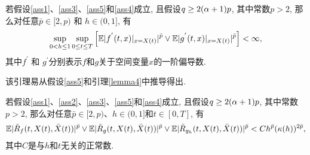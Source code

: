 \begin{lemma}
    \label{lemma4}
    若假设\ref{ass1}、\ref{ass3}、\ref{ass5}和\ref{ass4}成立, 且假设$q\geq 2(\alpha+1)p$, 其中常数$p>2$, 那么对任意$\bar{p}\in [2,p)$ 和 $h \in (0,1]$, 有
    \begin{align*}
        \sup_{0<h\leq 1}\sup_{0\leq t\leq T}\left [\mathbb{E}| f^{'}(t,x)|_{x=X(t)}|^{\bar{p}}\vee\mathbb{E}| g^{'}(t,x)|_{x=X(t)}|^{\bar{p}}  \right ]< \infty ,
    \end{align*}
    其中$f^{'}$ 和 $g^{'}$分别表示$f$和$g$关于空间变量$x$的一阶偏导数.
    \par
     该引理易从假设\ref{ass5}和引理\ref{lemma4}中推导得出.
    \end{lemma} 
\begin{lemma}
    \label{lemma5}
    若假设\ref{ass1}、\ref{ass2}、\ref{ass3}、\ref{ass5}和\ref{ass4}成立, 且假设$q\geq 2(\alpha+1)p$, 其中常数$p>2$, 那么对任意$\bar{p}\in [2,p)$、$h \in (0,1]$和$t\in [0,T]$, 有
    \begin{align*}
        \mathbb{E}|\tilde{R}_{f}(t,X(t),\bar{X}(t))|^{\bar{p}}\vee\mathbb{E}|\tilde{R}_{g}(t,X(t),\bar{X}(t))|^{\bar{p}}\vee\mathbb{E}|\tilde{R}_{g_h}(t,X(t),\bar{X}(t))|^{\bar{p}} < Ch^{\bar{p}}(\kappa(h))^{2\bar{p}},
    \end{align*}
其中$C$是与$h$和$t$无关的正常数.
\end{lemma} 
    \par
